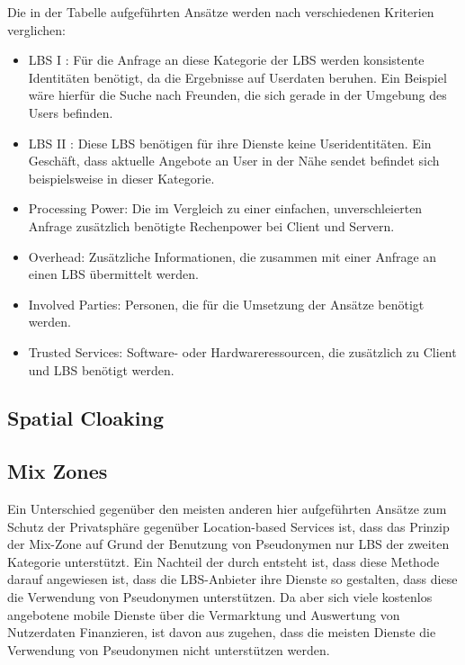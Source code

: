 Die in der Tabelle aufgeführten Ansätze werden nach verschiedenen Kriterien verglichen:
\begin{itemize}
	\item LBS I \cite{Chow2011}: Für die Anfrage an diese Kategorie der LBS werden konsistente Identitäten benötigt, da die Ergebnisse auf Userdaten beruhen. Ein Beispiel wäre hierfür die Suche nach Freunden, die sich gerade in der Umgebung des Users befinden.
	\item LBS II \cite{Chow2011}: Diese LBS benötigen für ihre Dienste keine Useridentitäten. Ein Geschäft, dass aktuelle Angebote an User in der Nähe sendet befindet sich beispielsweise in dieser Kategorie.
	\item Processing Power: Die im Vergleich zu einer einfachen, unverschleierten Anfrage zusätzlich benötigte Rechenpower bei Client und Servern.
	\item Overhead: Zusätzliche Informationen, die zusammen mit einer Anfrage an einen LBS übermittelt werden.
	\item Involved Parties: Personen, die für die Umsetzung der Ansätze benötigt werden.
	\item Trusted Services: Software- oder Hardwareressourcen, die zusätzlich zu Client und LBS benötigt werden.
\end{itemize}

\subsection{Spatial Cloaking}

\subsection{Mix Zones}
Ein Unterschied gegenüber den  meisten anderen hier aufgeführten Ansätze zum Schutz der Privatsphäre gegenüber Location-based Services ist, dass das Prinzip der Mix-Zone  auf Grund der Benutzung von Pseudonymen nur LBS der zweiten Kategorie unterstützt. Ein Nachteil der durch entsteht ist, dass diese Methode darauf angewiesen ist, dass die LBS-Anbieter ihre Dienste so gestalten, dass diese die Verwendung von Pseudonymen unterstützen. Da aber sich viele kostenlos angebotene mobile Dienste über die Vermarktung und Auswertung von Nutzerdaten Finanzieren,  ist davon aus zugehen, dass die meisten Dienste die Verwendung von Pseudonymen nicht unterstützen werden.

